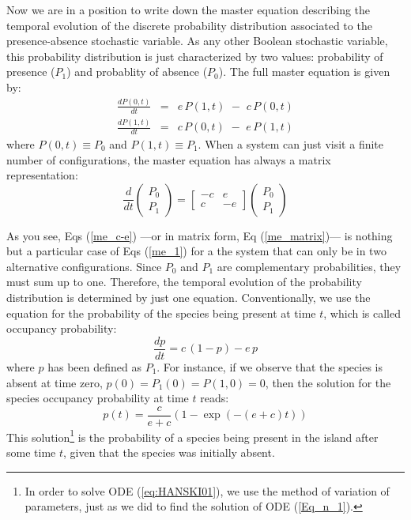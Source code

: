 \documentclass{article}
\begin{document}
Now we are in a position to write down the master equation describing the temporal evolution of the discrete probability distribution associated to the presence-absence stochastic variable. As any other Boolean stochastic variable, this probability distribution is just characterized by two values: probability of presence ($P_1$) and probablity of absence ($P_0$). The full master equation is given by:
\begin{eqnarray}
\frac{dP(0,t)}{dt} &=&    e\, P(1,t) \,\, - \,\, c\, P(0,t)  \nonumber \\
\frac{dP(1,t)}{dt} &=&    c\, P(0,t) \,\, - \,\, e\, P(1,t)  
\label{me_c-e}
\end{eqnarray}
where $P(0,t) \equiv P_0$ and $P(1,t) \equiv P_1$. When a system can just visit a finite number of configurations, the master equation has always a matrix representation: 
\begin{equation}
\label{me_matrix}
\frac{d}{dt}\left(
\begin{array}{c}
P_0 \\ 
P_1 
\end{array}
\right) = \left[\begin{array}{cc}
-c &  e \\
 c & -e 
 \end{array} 
\right]
\left(
\begin{array}{c}
P_0 \\ 
P_1 
\end{array}
\right)
\end{equation}

As you see, Eqs (\ref{me_c-e}) ---or in matrix form, Eq (\ref{me_matrix})--- is nothing but a particular case of Eqs (\ref{me_1}) for a the system that can only be in two alternative configurations. Since $P_0$ and $P_1$ are complementary probabilities, they must sum up to one. Therefore, the temporal evolution of the probability distribution is determined by just one equation. Conventionally, we use the equation for the probability of the species being present at time $t$, which is called occupancy probability:
\begin{equation}
\frac{dp}{dt} = c\,(1-p) - e\,p
\label{eq:HANSKI01}
\end{equation}
where $p$ has been defined as $P_1$. For instance, if we observe that the species is absent at time zero, $p(0) = P_1(0) = P(1,0) = 0$, then the solution for the species occupancy probability at time $t$ reads:
\begin{equation}
\label{t_10}
p(t) = \frac{c}{e+c} ( 1 - \exp(-(e+c)t ))
\end{equation}
This solution\footnote{In order to solve ODE (\ref{eq:HANSKI01}), we use the method of variation of parameters, just as we did to find the solution of ODE (\ref{Eq_n_1}).} is the probability of a species being present in the island after some time $t$, given that the species was initially absent. 
\smallskip
\end{document}
